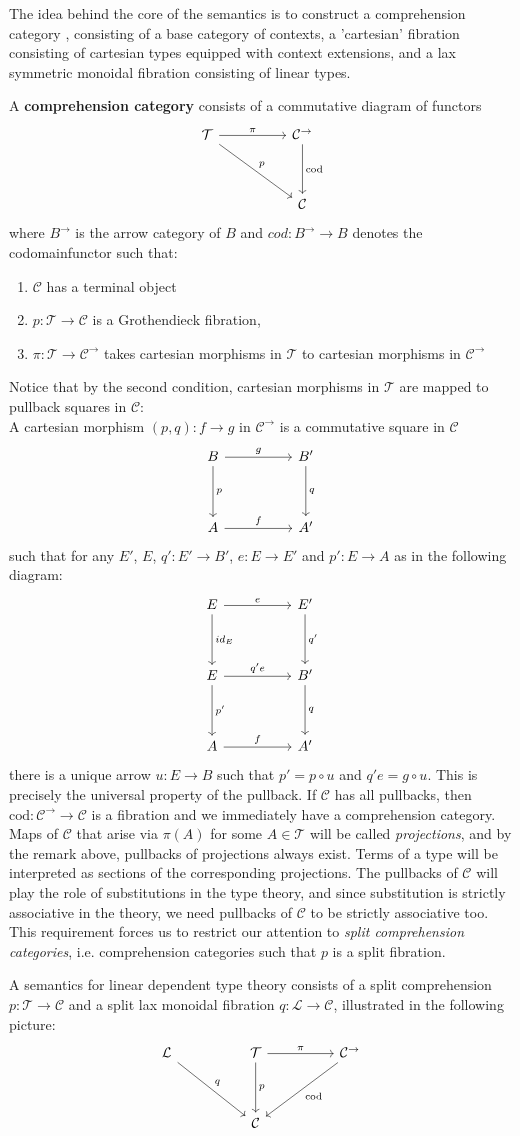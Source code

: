 The idea behind the core of the semantics is to construct a comprehension category \cite{jacobs}, consisting of a base category of contexts, a 'cartesian' fibration consisting of cartesian types equipped with context extensions, and a lax symmetric monoidal fibration consisting of linear types.
\begin{defn}
A \textbf{comprehension category} consists of a commutative diagram of functors
\[
\ti
\mathcal{T} \ar[rd, "p"] \ar[r, "\pi"]  & \mathcal{C}^{\to} \ar[d, "\text{cod}"]\\
& \mathcal{C}
\kz
\]
where $B^\to$ is the arrow category of $B$ and $cod : B^\to \to B$ denotes the codomainfunctor such that:
\begin{enumerate}%
\item $\mathcal{C}$ has a terminal object
\item $p : \mathcal{T} \to \mathcal{C}$ is a Grothendieck fibration,
\item $\pi : \mathcal{T} \to \mathcal{C}^\to$ takes cartesian morphisms in $\mathcal{T}$ to cartesian morphisms in $\mathcal{C}^\to$
\end{enumerate}
Notice that by the second condition, cartesian morphisms in $\mathcal{T}$ are mapped to pullback squares in $\mathcal{C}$:\\
A cartesian morphism $(p, q) : f \to g$ in $\mathcal{C}^\to$ is a commutative square in $\mathcal{C}$
\[
\ti
B \ar[r, "g"] \ar[d, "p"] & B' \ar[d, "q"]\\
A \ar[r,"f"] & A'
\kz
\]
such that for any $E'$, $E$, $q' : E' \to B'$, $e : E \to E'$ and $p' : E \to A$ as in the following diagram:
\[
\ti
E \ar[d, "id_E"] \ar[r, "e"] & E' \ar[d, "q'"] \\
E \ar[d, "p'"] \ar[r, "q'e"] & B' \ar[d,"q"] \\
A \ar[r, "f"] & A'
\kz
\]
there is a unique arrow $u : E \to B$ such that $p' = p \circ u$ and $q'e = g \circ u$. This is precisely the universal property of the pullback.
If $\mathcal{C}$ has all pullbacks, then $\text{cod} : \mathcal{C}^\to \to \mathcal{C}$ is a fibration and we immediately have a comprehension category.
Maps of $\mathcal{C}$ that arise via $\pi(A)$ for some $A \in \mathcal{T}$ will be called \textit{projections}, and by the remark above, pullbacks of projections always exist. Terms of a type will be interpreted as sections of the corresponding projections. The pullbacks of $\mathcal{C}$ will play the role of substitutions in the type theory, and since substitution is strictly associative in the theory, we need pullbacks of $\mathcal{C}$ to be strictly associative too. This requirement forces us to restrict our attention to \textit{split comprehension categories}, i.e. comprehension categories such that $p$ is a split fibration.
\end{defn}
A semantics for linear dependent type theory consists of a split comprehension $p : \mathcal{T} \to \mathcal{C}$ and a split lax monoidal fibration $q : \mathcal{L} \to \mathcal{C}$, illustrated in the following picture:
\[
\ti
\mathcal{L} \ar[rd, "q"] & \mathcal{T} \ar[d, "p"] \ar[r, "\pi"] & \mathcal{C^\rightarrow} \ar[ld, "\text{cod}"]\\
& \mathcal{C}
\kz
\]

